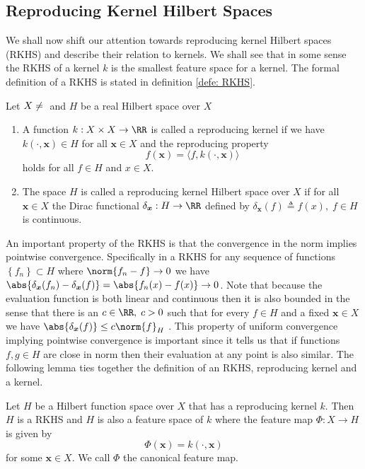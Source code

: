 \subsection{Reproducing Kernel Hilbert Spaces}\label{Section1.2}

We shall now shift our attention towards reproducing kernel Hilbert spaces (RKHS) and describe their relation to kernels. We shall see that in some sense the RKHS of a kernel $k$ is the smallest feature space for a kernel. The formal definition of a RKHS is stated in definition \ref{defe: RKHS}.

\begin{defe}[RKHS] \label{defe: RKHS}
    Let $X \neq \null$ and $H$ be a real Hilbert space over $X$
    \begin{enumerate}
        \item A function $k : X \times X \to \RR$ is called a reproducing kernel if we have $k \left( \cdot, \bm{x} \right) \in H$ for all $\bm{x} \in X$ and the reproducing property
              \[
                  f(\bm{x}) = \langle f , k \left( \cdot, \bm{x} \right) \rangle
              \]
              holds for all $f \in H$ and $x \in X$.
        \item The space $H$ is called a reproducing kernel Hilbert space over $X$ if for all $\bm{x} \in X$ the Dirac functional $\delta_{\bm{x}} : H \to \RR$ defined by $\delta_{\bm{x}} (f) \triangleq f(x), \; f \in H$ is continuous.
    \end{enumerate}
    \cite{SteinwartIngo2008SVMb}
\end{defe}

An important property of the RKHS is that the convergence in the norm implies pointwise convergence. Specifically in a RKHS for any sequence of functions $\left\{ f_n \right\} \subset H$ where $\norm{f_n - f} \to 0$ we have $\abs{\delta_{\bm{x}} (f_n) - \delta_{\bm{x}} (f)} = \abs{f_n (x) - f (x)} \to 0$. Note that because the evaluation function is both linear and continuous then it is also bounded in the sense that there is an $c \in \RR, \; c > 0$ such that for every $f \in H$ and a fixed $\bm{x} \in X$ we have $\abs{\delta_{\bm{x}} (f)} \leq c \norm{f}_H$ \cite{BerezanskyMakarovich1996FaV1}. This property of uniform convergence implying pointwise convergence is important since it tells us that if functions $f,g \in H$ are close in norm then their evaluation at any point is also similar. The following lemma ties together the definition of an RKHS, reproducing kernel and a kernel.

\begin{lem}[] \label{lem: RKHS_rk_k}
    Let $H$ be a Hilbert function space over $X$ that has a reproducing kernel $k$. Then $H$ is a RKHS and $H$ is also a feature space of $k$ where the feature map $\Phi : X \to H$ is given by
    \[
        \Phi (\bm{x}) = k \left( \cdot , \bm{x}  \right)
    \]
    for some $\bm{x} \in X$. We call $\Phi$ the canonical feature map.
\end{lem}

